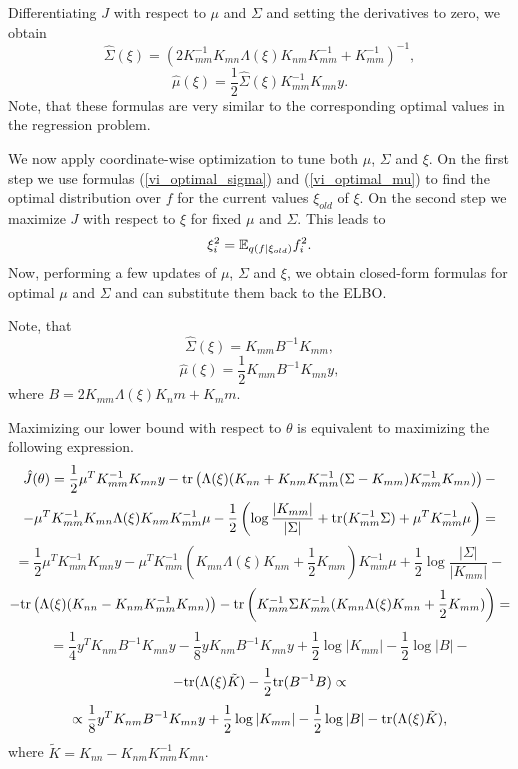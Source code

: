 Differentiating $J$ with respect to $\mu$ and $\Sigma$ and setting the derivatives to zero, we obtain
\begin{equation}\label{vi_optimal_sigma}
	\hat \Sigma(\xi) = (2 K_{mm}^{-1} K_{mn} \Lambda(\xi) K_{nm} K_{mm}^{-1} + K_{mm}^{-1})^{-1},
\end{equation}
\begin{equation}\label{vi_optimal_mu}
	\hat \mu(\xi) = \frac 1 2 \hat \Sigma(\xi) K_{mm}^{-1} K_{mn} y.
\end{equation}
Note, that these formulas are very similar to the corresponding optimal values in the regression problem.

We now apply coordinate-wise optimization to tune both $\mu$, $\Sigma$ and $\xi$. On the first step we use formulas (\ref{vi_optimal_sigma}) and (\ref{vi_optimal_mu}) to find the optimal distribution over $f$ for the current values $\xi_{old}$ of $\xi$. On the second step we maximize $J$ with respect to $\xi$ for fixed $\mu$ and $\Sigma$. This leads to
$$\xi_i^2 = \mathbb{E}_{q(f | \xi_{old})} f_i^2.$$
Now, performing a few updates of $\mu$, $\Sigma$ and $\xi$, we obtain closed-form formulas for optimal
$\mu$ and $\Sigma$ and can substitute them back to the ELBO.

Note, that
$$\hat\Sigma(\xi) = K_{mm} B^{-1} K_{mm},$$
$$\hat\mu(\xi) = \frac 1 2 K_{mm} B^{-1} K_{mn} y,$$
where $B = 2 K_{mm} \Lambda(\xi) K_nm + K_mm$.

Maximizing our lower bound with respect to $\theta$ is equivalent to maximizing the following expression.
$$ \hat J(\theta) =  \frac 1 2 \mu^T K_{mm}^{-1} K_{mn} y - \mbox{tr}\left(\Lambda(\xi) (K_{nn} + K_{nm} K_{mm}^{-1} (\Sigma - K_{mm}) K_{mm}^{-1} K_{mn})\right) -$$
$$ - \mu^T K_{mm}^{-1} K_{mn} \Lambda(\xi) K_{nm} K_{mm}^{-1} \mu -\frac 1 2 \left (\log \frac {|K_{mm}|} {|\Sigma|} + \mbox{tr}(K_{mm}^{-1} \Sigma) + \mu^T K_{mm}^{-1} \mu \right) = $$
$$ = \frac 1 2 \mu^T K_{mm}^{-1} K_{mn} y - \mu^T K_{mm}^{-1}\left(K_{mn} \Lambda(\xi) K_{nm} + \frac 1 2 K_{mm} \right)K_{mm}^{-1}\mu + \frac 1 2 \log \frac {|\Sigma|}{|K_{mm}|} - $$
$$ - \mbox{tr}\left(\Lambda(\xi) (K_{nn} - K_{nm} K_{mm}^{-1} K_{mn})\right) - \mbox{tr}\left(K_{mm}^{-1} \Sigma K_{mm}^{-1} (K_{mn} \Lambda(\xi) K_{mn} + \frac 1 2 K_{mm})\right) = $$
$$ = \frac 1 4 y^T K_{nm} B^{-1} K_{mn} y - \frac 1 8 y K_{nm} B^{-1} K_{mn} y + \frac 1 2 \log |K_{mm}| - \frac 1 2 \log |B| - $$
$$ - \mbox{tr}(\Lambda(\xi) \tilde K) - \frac 1 2 \mbox{tr}(B^{-1} B) \propto $$
$$\propto \frac 1 8 y^T K_{nm} B^{-1} K_{mn} y + \frac 1 2 \log |K_{mm}| - \frac 1 2 \log |B| - \mbox{tr}(\Lambda(\xi) \tilde K),$$
where $\tilde K = K_{nn} - K_{nm} K_{mm}^{-1} K_{mn}$.


